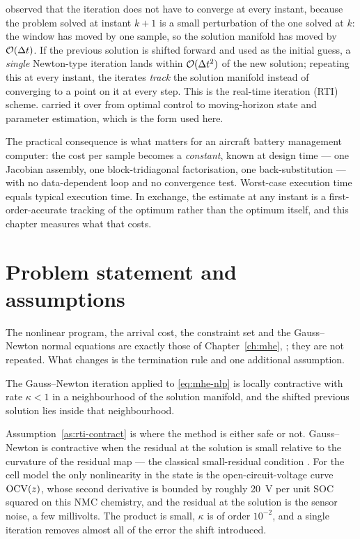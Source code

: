 \citet{diehl2005rti} observed that the iteration does not have to converge at every instant,
because the problem solved at instant $k{+}1$ is a small perturbation of the one solved at $k$: the
window has moved by one sample, so the solution manifold has moved by $\mathcal{O}(\Delta t)$.  If the
previous solution is shifted forward and used as the initial guess, a \emph{single} Newton-type
iteration lands within $\mathcal{O}(\Delta t^2)$ of the new solution; repeating this at every instant,
the iterates \emph{track} the solution manifold instead of converging to a point on it at every
step.  This is the real-time iteration (RTI) scheme.  \citet{kuhl2011rtimhe} carried it over from
optimal control to moving-horizon state and parameter estimation, which is the form used here.

The practical consequence is what matters for an aircraft battery management computer: the cost per
sample becomes a \emph{constant}, known at design time --- one Jacobian assembly, one
block-tridiagonal factorisation, one back-substitution --- with no data-dependent loop and no
convergence test.  Worst-case execution time equals typical execution time.  In exchange, the
estimate at any instant is a first-order-accurate tracking of the optimum rather than the optimum
itself, and this chapter measures what that costs.

\section{Problem statement and assumptions}
The nonlinear program, the arrival cost, the constraint set and the Gauss--Newton normal equations
are exactly those of Chapter~\ref{ch:mhe}, ; they are not
repeated.  What changes is the termination rule and one additional assumption.

\begin{assumption}\label{as:rti-contract}
The Gauss--Newton iteration applied to \cref{eq:mhe-nlp} is locally contractive with rate
$\kappa < 1$ in a neighbourhood of the solution manifold, and the shifted previous solution lies
inside that neighbourhood.
\end{assumption}

Assumption~\ref{as:rti-contract} is where the method is either safe or not.  Gauss--Newton is
contractive when the residual at the solution is small relative to the curvature of the residual
map --- the classical small-residual condition \citep[\S10.3]{nocedal2006}.  For the cell model the
only nonlinearity in the state is the open-circuit-voltage curve $\mathrm{OCV}(z)$, whose second
derivative is bounded by roughly \SI{20}{\volt} per unit SOC squared on this NMC chemistry, and the
residual at the solution is the sensor noise, a few millivolts.  The product is small, $\kappa$ is
of order $10^{-2}$, and a single iteration removes almost all of the error the shift introduced.

